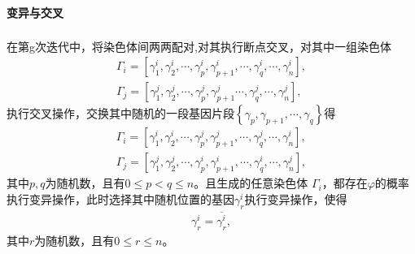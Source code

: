 \documentclass{whutmod}
\newcommand{\upcite}[1]{\textsuperscript{\cite{#1}}}
\begin{document}
    	\paragraph{变异与交叉}
    	在第g次迭代中，将染色体间两两配对,对其执行断点交叉\upcite{3,4}，对其中一组染色体
    		\begin{gather*}
    \Gamma_i=[\gamma_1^i,\gamma_2^i,\cdots, \gamma_p^i,\gamma_{p+1}^i,\cdots,\gamma_q^i,\cdots,\gamma_n^i],\\
    \Gamma_j=[\gamma_1^j,\gamma_2^j,\cdots, \gamma_p^j,\gamma_{p+1}^j\cdots,\gamma_q^j,\cdots,\gamma_n^j],
    		\end{gather*}
    	执行交叉操作，交换其中随机的一段基因片段$\left \{ \gamma_p,\gamma_{p+1},\cdots,\gamma_q\right \}$得
    		\begin{gather*}
    	\Gamma_i=[\gamma_1^i,\gamma_2^i,\cdots, \gamma_p^j,\gamma_{p+1}^j,\cdots,\gamma_q^j,\cdots,\gamma_n^i],\\
    	\Gamma_j=[\gamma_1^j,\gamma_2^j,\cdots, \gamma_p^i,\gamma_{p+1}^i,\cdots,\gamma_q^i,\cdots,\gamma_n^j],
    	\end{gather*}
    	其中$p,q$为随机数，且有$0\leqslant p<q\leqslant n$。且生成的任意染色体 $\Gamma_i$，都存在$\varphi $的概率执行变异操作，此时选择其中随机位置的基因$\gamma_r^i$执行变异操作，使得
    	\begin{gather*}
       \gamma_r^i=\overline{\gamma_r^i},
    	\end{gather*}
    	其中$r$为随机数，且有$0\leqslant r\leqslant n$。
\end{document}
